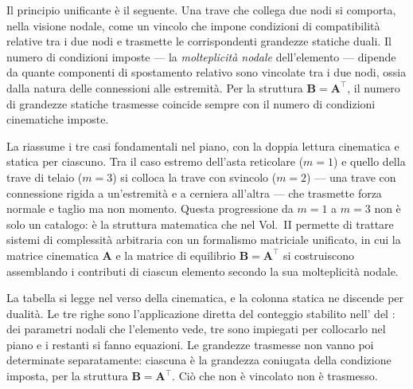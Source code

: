 Il principio unificante è il seguente. Una trave
che collega due nodi si comporta, nella visione
nodale, come un vincolo che impone condizioni di
compatibilità relative tra i due nodi e trasmette
le corrispondenti grandezze statiche duali. Il
numero di condizioni imposte --- la
\emph{molteplicità nodale} dell'elemento --- dipende
da quante componenti di spostamento relativo sono
vincolate tra i due nodi, ossia dalla natura delle
connessioni alle estremità. Per la struttura
$\bm{B} = \bm{A}^\top$, il numero di grandezze
statiche trasmesse coincide sempre con il numero
di condizioni cinematiche imposte.

La  riassume i tre casi
fondamentali nel piano, con la doppia lettura
cinematica e statica per ciascuno. 
Tra il caso
estremo dell'asta reticolare ($m = 1$) e quello
della trave di telaio ($m = 3$) si colloca la
trave con svincolo ($m = 2$) --- una trave con
connessione rigida a un'estremità e a cerniera
all'altra --- che trasmette forza normale e taglio
ma non momento. Questa progressione da $m = 1$
a $m = 3$ non è solo un catalogo: è la struttura
matematica che nel Vol.~II permette di trattare
sistemi di complessità arbitraria con un formalismo
matriciale unificato, in cui la matrice cinematica
$\bm{A}$ e la matrice di equilibrio
$\bm{B} = \bm{A}^\top$ si costruiscono
assemblando i contributi di ciascun elemento
secondo la sua molteplicità nodale.

La tabella si legge nel verso della cinematica, e la
	colonna statica ne discende per dualità. Le tre righe sono
	l'applicazione diretta del conteggio stabilito
	nell' del
	: dei parametri nodali che
	l'elemento vede, tre sono impiegati per collocarlo nel piano
	e i restanti si fanno equazioni. Le grandezze trasmesse non
	vanno poi determinate separatamente: ciascuna è la grandezza
	coniugata della condizione imposta, per la struttura
	$\bm{B} = \bm{A}^\top$. Ciò che non è vincolato non è
	trasmesso.

